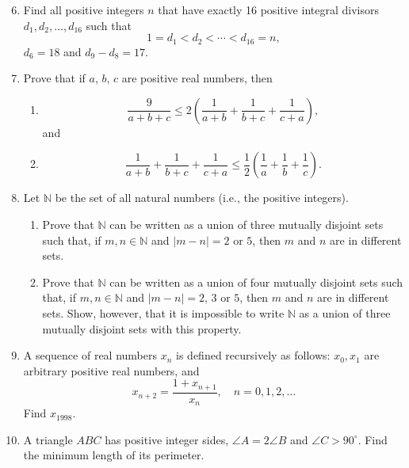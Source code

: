 \documentclass[12pt]{article}
\begin{document}
\begin{enumerate}
\setcounter{enumi}{5}
\item Find all positive integers $n$ that have exactly 16 positive integral divisors $d_1, d_2, \ldots, d_{16}$ such that
\[
1 = d_1 < d_2 < \cdots < d_{16} = n,
\]
$d_6 = 18$ and $d_9 - d_8 = 17$.

\item Prove that if $a$, $b$, $c$ are positive real numbers, then
\begin{enumerate}
\item[(a)]
\[
\frac{9}{a + b + c} \leq 2\left(\frac{1}{a+b} + \frac{1}{b+c} + \frac{1}{c+a}\right),
\]
and
\item[(b)]
\[
\frac{1}{a+b} + \frac{1}{b+c} + \frac{1}{c+a} \leq \frac{1}{2}\left(\frac{1}{a} + \frac{1}{b} + \frac{1}{c}\right).
\]
\end{enumerate}

\item Let $\mathbb{N}$ be the set of all natural numbers (i.e., the positive integers).
\begin{enumerate}
\item[(a)] Prove that $\mathbb{N}$ can be written as a union of three mutually disjoint sets such that, if $m, n \in \mathbb{N}$ and $|m - n| = 2$ or $5$, then $m$ and $n$ are in different sets.
\item[(b)] Prove that $\mathbb{N}$ can be written as a union of four mutually disjoint sets such that, if $m, n \in \mathbb{N}$ and $|m - n| = 2$, $3$ or $5$, then $m$ and $n$ are in different sets. Show, however, that it is impossible to write $\mathbb{N}$ as a union of three mutually disjoint sets with this property.
\end{enumerate}

\item A sequence of real numbers $x_n$ is defined recursively as follows: $x_0, x_1$ are arbitrary positive real numbers, and
\[
x_{n+2} = \frac{1 + x_{n+1}}{x_n}, \quad n = 0, 1, 2, \ldots
\]
Find $x_{1998}$.

\item A triangle $ABC$ has positive integer sides, $\angle A = 2\angle B$ and $\angle C > 90^\circ$. Find the minimum length of its perimeter.

\end{enumerate}
\end{document}
